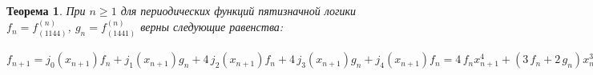 \documentclass[a4paper, 12pt]{extarticle}
\newtheorem{myth}{Теорема}
\begin{document}
\begin{myth} При $n \geqslant 1 $ для периодических функций пятизначной логики $f_n = f^{\left(n\right)}_{\left(1144\right)}$,
$g_n = f^{\left(n\right)}_{\left(1441\right)}$ верны следующие равенства:
\end{myth}$ f_{n+1} = j_0(x_{n+1})f_n + j_1(x_{n+1})g_n + 4\,j_2(x_{n+1})f_n + 4\,j_3(x_{n+1})g_n + j_4(x_{n+1})f_n = 4 \, f_{n} x_{n+1}^{4} + {\left(3 \, f_{n} + 2 \, g_{n}\right)} x_{n+1}^{3} + 3 \, {\left(f_{n} + g_{n}\right)} x_{n+1}^{2} + {\left(4 \, f_{n} + g_{n}\right)} x_{n+1} + f_{n}
 = 4 \, f_{n} {\left(x_{n+1} + 1\right)}^{4} + 2 \, {\left(f_{n} + g_{n}\right)} {\left(x_{n+1} + 1\right)}^{3} + {\left(3 \, f_{n} + 2 \, g_{n}\right)} {\left(x_{n+1} + 1\right)}^{2} + {\left(f_{n} + g_{n}\right)} {\left(x_{n+1} + 1\right)} + f_{n}
 = 4 \, f_{n} {\left(x_{n+1} + 2\right)}^{4} + {\left(f_{n} + 2 \, g_{n}\right)} {\left(x_{n+1} + 2\right)}^{3} + {\left(f_{n} + g_{n}\right)} {\left(x_{n+1} + 2\right)}^{2} + 3 \, g_{n} {\left(x_{n+1} + 2\right)} + 4 \, g_{n}
 = 4 \, f_{n} {\left(x_{n+1} + 3\right)}^{4} + 2 \, g_{n} {\left(x_{n+1} + 3\right)}^{3} + 2 \, f_{n} {\left(x_{n+1} + 3\right)}^{2} + 2 \, g_{n} {\left(x_{n+1} + 3\right)} + 4 \, f_{n}
 = 4 \, f_{n} {\left(x_{n+1} + 4\right)}^{4} + 2 \, {\left(2 \, f_{n} + g_{n}\right)} {\left(x_{n+1} + 4\right)}^{3} + {\left(f_{n} + 4 \, g_{n}\right)} {\left(x_{n+1} + 4\right)}^{2} + 3 \, g_{n} {\left(x_{n+1} + 4\right)} + g_{n}
$
\end{document}
